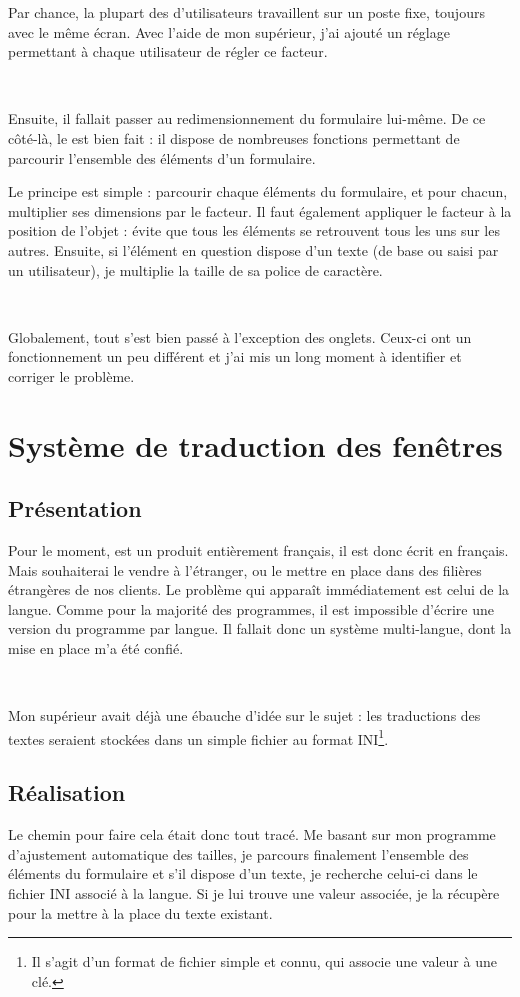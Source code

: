 Par chance, la plupart des d'utilisateurs travaillent sur un poste fixe, toujours avec le même écran. Avec l'aide de mon supérieur, j'ai ajouté un réglage permettant à chaque utilisateur de régler ce facteur.

~

Ensuite, il fallait passer au redimensionnement du formulaire lui-même. De ce côté-là, le \vb{} est bien fait : il dispose de nombreuses fonctions permettant de parcourir l'ensemble des éléments d'un formulaire.

Le principe est simple : parcourir chaque éléments du formulaire, et pour chacun, multiplier ses dimensions par le facteur. Il faut également appliquer le facteur à la position de l'objet : évite que tous les éléments se retrouvent tous les uns sur les autres. Ensuite, si l'élément en question dispose d'un texte (de base ou saisi par un utilisateur), je multiplie la taille de sa police de caractère.

~

Globalement, tout s'est bien passé à l'exception des onglets. Ceux-ci ont un fonctionnement un peu différent et j'ai mis un long moment à identifier et corriger le problème.

\section{Système de traduction des fenêtres}
\subsection{Présentation}
Pour le moment, \integrale{} est un produit entièrement français, il est donc écrit en français. Mais \solulog{} souhaiterai le vendre à l'étranger, ou le mettre en place dans des filières étrangères de nos clients. Le problème qui apparaît immédiatement est celui de la langue. Comme pour la majorité des programmes, il est impossible d'écrire une version du programme par langue. Il fallait donc un système multi-langue, dont la mise en place m'a été confié.

~

Mon supérieur avait déjà une ébauche d'idée sur le sujet : les traductions des textes seraient stockées dans un simple fichier au format INI\footnote{Il s'agit d'un format de fichier simple et connu, qui associe une valeur à une clé.}.

\subsection{Réalisation}
Le chemin pour faire cela était donc tout tracé. Me basant sur mon programme d'ajustement automatique des tailles, je parcours finalement l'ensemble des éléments du formulaire et s'il dispose d'un texte, je recherche celui-ci dans le fichier INI associé à la langue. Si je lui trouve une valeur associée, je la récupère pour la mettre à la place du texte existant.


